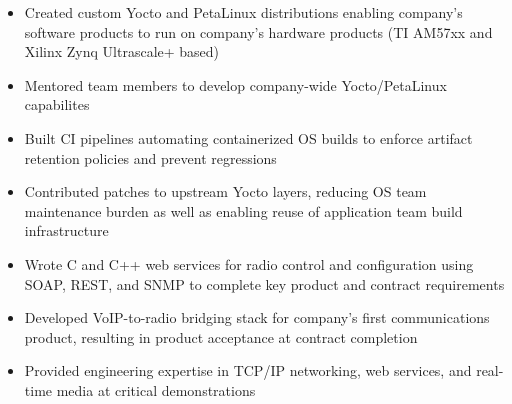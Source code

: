 \begin{itemize}
    \item Created custom Yocto and PetaLinux distributions enabling company's software products to run on company's hardware products (TI AM57xx and Xilinx Zynq Ultrascale+ based)
    \item Mentored team members to develop company-wide Yocto/PetaLinux capabilites
    \item Built CI pipelines automating containerized OS builds to enforce artifact retention policies and prevent regressions
    \item Contributed patches to upstream Yocto layers, reducing OS team maintenance burden as well as enabling reuse of application team build infrastructure
    \item Wrote C and C++ web services for radio control and configuration using SOAP, REST, and SNMP to complete key product and contract requirements
    \item Developed VoIP-to-radio bridging stack for company's first communications product, resulting in product acceptance at contract completion
    \item Provided engineering expertise in TCP/IP networking, web services, and real-time media at critical demonstrations
\end{itemize}
